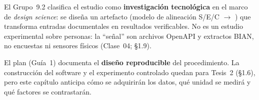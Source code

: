 El Grupo~9.2 clasifica el estudio como \textbf{investigación tecnológica} en el marco de
\textit{design science}: se diseña un artefacto (modelo de alineación S/E/C $\rightarrow$
\AlignmentScore{}) que transforma entradas documentales en resultados verificables. No es un estudio
experimental sobre personas: la ``señal'' son archivos OpenAPI y extractos BIAN, no encuestas ni
sensores físicos (Clase~04; §1.9).

El plan (Guía~1) documenta el \textbf{diseño reproducible} del procedimiento. La construcción del
software y el experimento controlado quedan para Tesis~2 (§1.6), pero este capítulo anticipa
cómo se adquirirán los datos, qué unidad se medirá y qué factores se contrastarán.
